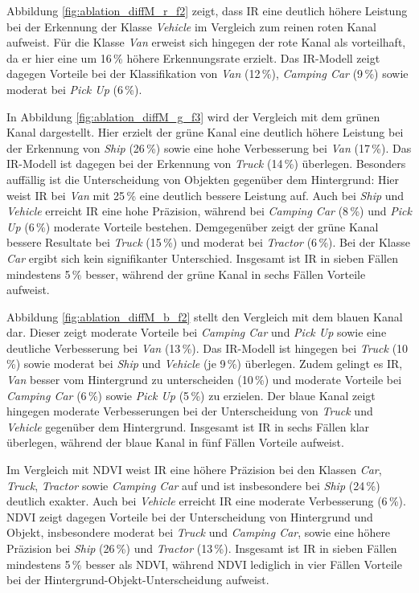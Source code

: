 Abbildung \ref{fig:ablation_diffM_r_f2} zeigt, dass IR eine deutlich höhere Leistung bei der Erkennung der Klasse \textit{Vehicle} im Vergleich zum reinen roten Kanal aufweist. Für die Klasse \textit{Van} erweist sich hingegen der rote Kanal als vorteilhaft, da er hier eine um 16\,\% höhere Erkennungsrate erzielt. Das IR-Modell zeigt dagegen Vorteile bei der Klassifikation von \textit{Van} (12\,\%), \textit{Camping Car} (9\,\%) sowie moderat bei \textit{Pick Up} (6\,\%).  

In Abbildung \ref{fig:ablation_diffM_g_f3} wird der Vergleich mit dem grünen Kanal dargestellt. Hier erzielt der grüne Kanal eine deutlich höhere Leistung bei der Erkennung von \textit{Ship} (26\,\%) sowie eine hohe Verbesserung bei \textit{Van} (17\,\%). Das IR-Modell ist dagegen bei der Erkennung von \textit{Truck} (14\,\%) überlegen. Besonders auffällig ist die Unterscheidung von Objekten gegenüber dem Hintergrund: Hier weist IR bei \textit{Van} mit 25\,\% eine deutlich bessere Leistung auf. Auch bei \textit{Ship} und \textit{Vehicle} erreicht IR eine hohe Präzision, während bei \textit{Camping Car} (8\,\%) und \textit{Pick Up} (6\,\%) moderate Vorteile bestehen. Demgegenüber zeigt der grüne Kanal bessere Resultate bei \textit{Truck} (15\,\%) und moderat bei \textit{Tractor} (6\,\%). Bei der Klasse \textit{Car} ergibt sich kein signifikanter Unterschied. Insgesamt ist IR in sieben Fällen mindestens 5\,\% besser, während der grüne Kanal in sechs Fällen Vorteile aufweist.  

Abbildung \ref{fig:ablation_diffM_b_f2} stellt den Vergleich mit dem blauen Kanal dar. Dieser zeigt moderate Vorteile bei \textit{Camping Car} und \textit{Pick Up} sowie eine deutliche Verbesserung bei \textit{Van} (13\,\%). Das IR-Modell ist hingegen bei \textit{Truck} (10\,\%) sowie moderat bei \textit{Ship} und \textit{Vehicle} (je 9\,\%) überlegen. Zudem gelingt es IR, \textit{Van} besser vom Hintergrund zu unterscheiden (10\,\%) und moderate Vorteile bei \textit{Camping Car} (6\,\%) sowie \textit{Pick Up} (5\,\%) zu erzielen. Der blaue Kanal zeigt hingegen moderate Verbesserungen bei der Unterscheidung von \textit{Truck} und \textit{Vehicle} gegenüber dem Hintergrund. Insgesamt ist IR in sechs Fällen klar überlegen, während der blaue Kanal in fünf Fällen Vorteile aufweist.  

Im Vergleich mit NDVI weist IR eine höhere Präzision bei den Klassen \textit{Car}, \textit{Truck}, \textit{Tractor} sowie \textit{Camping Car} auf und ist insbesondere bei \textit{Ship} (24\,\%) deutlich exakter. Auch bei \textit{Vehicle} erreicht IR eine moderate Verbesserung (6\,\%). NDVI zeigt dagegen Vorteile bei der Unterscheidung von Hintergrund und Objekt, insbesondere moderat bei \textit{Truck} und \textit{Camping Car}, sowie eine höhere Präzision bei \textit{Ship} (26\,\%) und \textit{Tractor} (13\,\%). Insgesamt ist IR in sieben Fällen mindestens 5\,\% besser als NDVI, während NDVI lediglich in vier Fällen Vorteile bei der Hintergrund-Objekt-Unterscheidung aufweist.  

